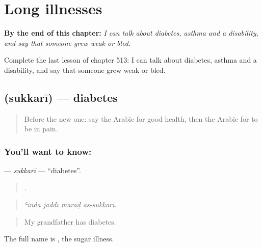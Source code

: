 
\chapter{Long illnesses}
\label{ch:ar-long-illnesses}

\begin{chapteropening}
\textbf{By the end of this chapter:} \emph{I can talk about diabetes, asthma and a disability, and say that someone grew weak or bled.}

Complete the last lesson of chapter 513: I can talk about diabetes, asthma and a disability, and say that someone grew weak or bled.
\end{chapteropening}

\section[\texorpdfstring{\ar{سكري} (sukkarī)}{سكري (sukkarī)}]{ (sukkarī) — diabetes}

\label{lesson:AR-C513-sukkari}



\begin{quote}
Before the new one: say the Arabic for good health, then the Arabic for to be in pain.
\end{quote}

\subsection*{You'll want to know: }
\textbf{} — \emph{sukkarī} — \textquotedblleft{}diabetes\textquotedblright{}.

\begin{quote}
   .
\end{quote}

\begin{quote}
\emph{ʿinda jaddī maraḍ as-sukkarī.}
\end{quote}

\begin{quote}
My grandfather has diabetes.
\end{quote}

The full name is  , the sugar illness.

